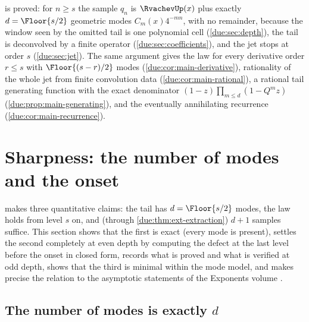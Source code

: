 \documentclass[11pt,oneside]{article}
\theoremstyle{plain}
\theoremstyle{definition}
\theoremstyle{remark}
\newcommand{\upn}[1]{\RvachevUp_{#1}}
\newcommand{\Qq}{Q}                                         %
\newcommand{\Cr}[2]{C_{#1}\!\left(#2\right)}                %
\newcommand{\qn}[1]{q_{#1}}                                 %
\begin{document}
\begin{summarybox}[title={Section summary}]
 is proved: for $n\ge s$ the sample $\qn{n}$ is
$\RvachevUp(x)$ plus exactly $d=\Floor{s/2}$ geometric modes
$\Cr{m}{x}4^{-mn}$, with no remainder, because the window seen by the
omitted tail is one polynomial cell (\cref{due:sec:depth}), the tail is
deconvolved by a finite operator (\cref{due:sec:coefficients}), and the jet
stops at order $s$ (\cref{due:sec:jet}).  The same argument gives the law
for every derivative order $r\le s$ with $\Floor{(s-r)/2}$ modes
(\cref{due:cor:main-derivative}), rationality of the whole jet from finite
convolution data (\cref{due:cor:main-rational}), a rational tail generating
function with the exact denominator $(1-z)\prod_{m\le d}(1-\Qq^{m}z)$
(\cref{due:prop:main-generating}), and the eventually annihilating
recurrence (\cref{due:cor:main-recurrence}).
\end{summarybox}

\section{Sharpness: the number of modes and the onset}
\label{due:sec:sharpness}

 makes three quantitative claims: the tail has
$d=\Floor{s/2}$ modes, the law holds from level $s$ on, and (through
\cref{due:thm:ext-extraction}) $d+1$ samples suffice.  This section shows
that the first is exact (every mode is present), settles the second
completely at even depth by computing the defect at the last level before
the onset in closed form, records what is proved and what is verified at
odd depth, shows that the third is minimal within the mode model, and
makes precise the relation to the asymptotic statements of the Exponents
volume \cite{proveit-exponents}.

\subsection{The number of modes is exactly \texorpdfstring{$d$}{d}}
\label{due:sec:sharp-modes}
\end{document}
